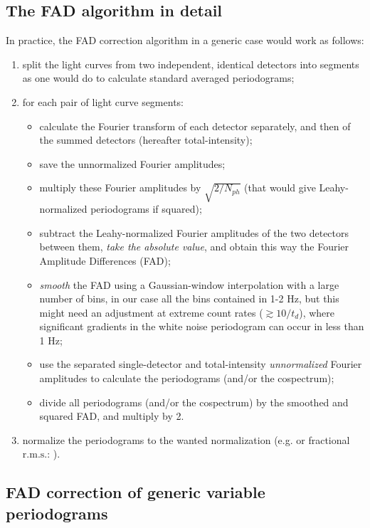 \documentclass[twocolumn]{aastex61}
\newcommand{\deadt}{\ensuremath{t_d}\xspace}
\newcommand{\rms}{\ensuremath{\mathrm{r.m.s.}}\xspace}
\begin{document}
\subsection{The FAD algorithm in detail} \label{sec:fad}
In practice, the FAD correction algorithm in a generic case would work as follows:
\begin{enumerate}
\item split the light curves from two independent, identical detectors into segments as one would do to calculate standard averaged periodograms;
\item for each pair of light curve segments: 
	\begin{itemize}
	\item calculate the Fourier transform of each detector separately, and then of the summed detectors (hereafter total-intensity); 
	\item save the unnormalized Fourier amplitudes;
	\item multiply these Fourier amplitudes by $\sqrt{2/N_{ph}}$ (that would give Leahy-normalized periodograms if squared);
	\item subtract the Leahy-normalized Fourier amplitudes of the two detectors between them, \textit{take the absolute value}, and obtain this way the Fourier Amplitude Differences (FAD);
	\item \textit{smooth} the FAD using a Gaussian-window interpolation with a large number of bins, in our case all the bins contained in 1-2 Hz, but this might need an adjustment at extreme count rates ($\gtrsim 10/\deadt$), where significant gradients in the white noise periodogram can occur in less than 1 Hz;
	\item use the separated single-detector and total-intensity \textit{unnormalized} Fourier amplitudes to calculate the periodograms (and/or the cospectrum);
	\item divide all periodograms (and/or the cospectrum) by the smoothed and squared FAD, and multiply by 2.
	\end{itemize}
\item normalize the periodograms to the wanted normalization (e.g. \citealt{Leahy+83} or fractional \rms: \citealt{BelloniHasinger90,Miyamoto+91}).
\end{enumerate}

\subsection{FAD correction of generic variable periodograms} \label{sec:correction}
\end{document}
